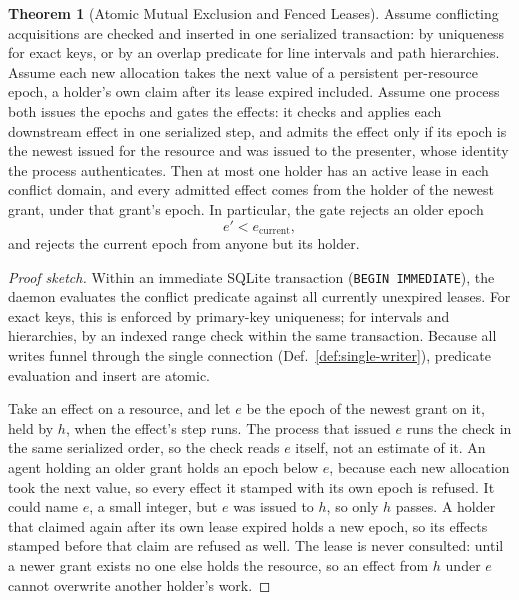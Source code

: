 \documentclass[11pt,a4paper]{article}
\theoremstyle{definition}
\newtheorem{theorem}{Theorem}[section]
\theoremstyle{remark}
\begin{document}
\begin{theorem}[Atomic Mutual Exclusion and Fenced Leases]\label{thm:exclusion}
\setlength{\parskip}{4pt plus 1pt}
Assume conflicting acquisitions are checked and inserted in one serialized
transaction: by uniqueness for exact keys, or by an overlap predicate for
line intervals and path hierarchies. Assume each new allocation takes the
next value of a persistent per-resource epoch, a holder's own claim after its
lease expired included. Assume one process both issues
the epochs and gates the effects: it checks and applies each downstream effect
in one serialized step, and admits the effect only if its epoch is the newest
issued for the resource and was issued to the presenter, whose identity the
process authenticates. Then at most one holder has an active lease in each
conflict domain, and every admitted effect comes from the holder of the newest
grant, under that grant's epoch. In particular, the gate rejects an older epoch
\[
e' < e_{\text{current}},
\]
and rejects the current epoch from anyone but its holder.
\end{theorem}

\begin{proof}[Proof sketch]
\setlength{\parskip}{4pt plus 1pt}
Within an immediate SQLite transaction (\texttt{BEGIN IMMEDIATE}), the daemon evaluates the conflict predicate against all currently unexpired leases. For exact keys, this is enforced by primary-key uniqueness; for intervals and hierarchies, by an indexed range check within the same transaction. Because all writes funnel through the single connection (Def.~\ref{def:single-writer}), predicate evaluation and insert are atomic.

Take an effect on a resource, and let $e$ be the epoch of the newest grant on it, held by $h$, when the effect's step runs. The process that issued $e$ runs the check in the same serialized order, so the check reads $e$ itself, not an estimate of it. An agent holding an older grant holds an epoch below $e$, because each new allocation took the next value, so every effect it stamped with its own epoch is refused. It could name $e$, a small integer, but $e$ was issued to $h$, so only $h$ passes. A holder that claimed again after its own lease expired holds a new epoch, so its effects stamped before that claim are refused as well. The lease is never consulted: until a newer grant exists no one else holds the resource, so an effect from $h$ under $e$ cannot overwrite another holder's work.
\end{proof}
\end{document}
